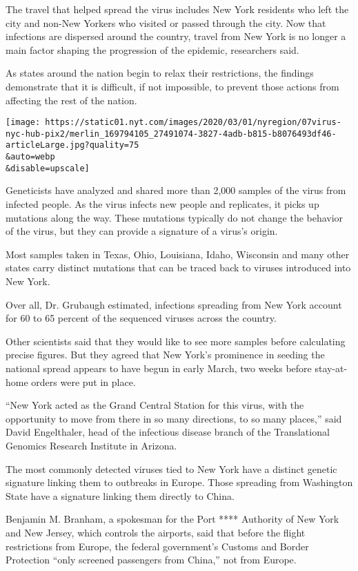 The travel that helped spread the virus includes New York residents who
left the city and non-New Yorkers who visited or passed through the
city. Now that infections are dispersed around the country, travel from
New York is no longer a main factor shaping the progression of the
epidemic, researchers said.

As states around the nation begin to relax their restrictions, the
findings demonstrate that it is difficult, if not impossible, to prevent
those actions from affecting the rest of the nation.

\texttt{[image: https://static01.nyt.com/images/2020/03/01/nyregion/07virus-nyc-hub-pix2/merlin\_169794105\_27491074-3827-4adb-b815-b8076493df46-articleLarge.jpg?quality=75\\\&auto=webp\\\&disable=upscale]}

Geneticists have analyzed and shared more than 2,000 samples of the
virus from infected people. As the virus infects new people and
replicates, it picks up mutations along the way. These mutations
typically do not change the behavior of the virus, but they can provide
a signature of a virus's origin.

Most samples taken in Texas, Ohio, Louisiana, Idaho, Wisconsin and many
other states carry distinct mutations that can be traced back to viruses
introduced into New York.

Over all, Dr. Grubaugh estimated, infections spreading from New York
account for 60 to 65 percent of the sequenced viruses across the
country.

Other scientists said that they would like to see more samples before
calculating precise figures. But they agreed that New York's prominence
in seeding the national spread appears to have begun in early March, two
weeks before stay-at-home orders were put in place.

``New York acted as the Grand Central Station for this virus, with the
opportunity to move from there in so many directions, to so many
places,'' said David Engelthaler, head of the infectious disease branch
of the Translational Genomics Research Institute in Arizona.

The most commonly detected viruses tied to New York have a distinct
genetic signature linking them to outbreaks in Europe. Those spreading
from Washington State have a signature linking them directly to China.

Benjamin M. Branham, a spokesman for the Port **** Authority of New York
and New Jersey, which controls the airports, said that before the flight
restrictions from Europe, the federal government's Customs and Border
Protection ``only screened passengers from China,'' not from Europe.

